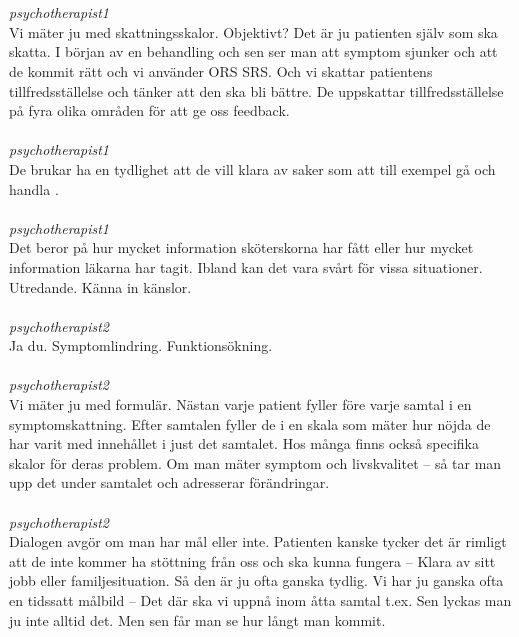 \documentclass[12pt,a4paper,oneside]{article}
\begin{document}
\ \\\ \\
 { \it   psychotherapist1 %
}\\
Vi m{\"a}ter ju med skattningsskalor. Objektivt? Det {\"a}r ju patienten sj{\"a}lv som ska skatta. I b{\"o}rjan av en behandling och sen ser man att symptom sjunker och att de kommit r{\"a}tt och vi anv{\"a}nder ORS SRS. Och vi skattar patientens tillfredsst{\"a}llelse och t{\"a}nker att den ska bli b{\"a}ttre. De uppskattar tillfredsst{\"a}llelse p{\aa} fyra olika omr{\aa}den f{\"o}r att ge oss feedback. %
\ \\\ \\
 { \it   psychotherapist1 %
}\\
De brukar ha en tydlighet att de vill klara av saker som att till exempel g{\aa} och handla . %
\ \\\ \\
 { \it   psychotherapist1 %
}\\
Det beror p{\aa} hur mycket information sk{\"o}terskorna har f{\aa}tt eller hur mycket information l{\"a}karna har tagit. Ibland kan det vara sv{\aa}rt f{\"o}r vissa situationer. Utredande. K{\"a}nna in k{\"a}nslor. %
\ \\\ \\
 { \it   psychotherapist2 %
}\\
Ja du. Symptomlindring. Funktions{\"o}kning.  %
\ \\\ \\
 { \it   psychotherapist2 %
}\\
Vi m{\"a}ter ju med formul{\"a}r. N{\"a}stan varje patient fyller f{\"o}re varje samtal i en symptomskattning. Efter samtalen fyller de i en skala som m{\"a}ter hur n{\"o}jda de har varit med inneh{\aa}llet i just det samtalet. Hos m{\aa}nga finns ocks{\aa} specifika skalor f{\"o}r deras problem. Om man m{\"a}ter symptom och livskvalitet -- s{\aa} tar man upp det under samtalet och adresserar f{\"o}r{\"a}ndringar. %
\ \\\ \\
 { \it   psychotherapist2 %
}\\
Dialogen avg{\"o}r om man har m{\aa}l eller inte. Patienten kanske tycker det {\"a}r rimligt att de inte kommer ha st{\"o}ttning fr{\aa}n oss och ska kunna fungera -- Klara av sitt jobb eller familjesituation. S{\aa} den {\"a}r ju ofta ganska tydlig. Vi har ju ganska ofta en tidssatt m{\aa}lbild -- Det d{\"a}r ska vi uppn{\aa} inom {\aa}tta samtal t.ex. Sen lyckas man ju inte alltid det. Men sen f{\aa}r man se hur l{\aa}ngt man kommit. %
\end{document}
